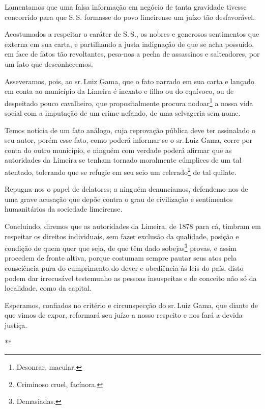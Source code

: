 Lamentamos que uma falsa informação em negócio de tanta gravidade
tivesse concorrido para que S.\,S. formasse do povo limeirense um juízo
tão desfavorável.

Acostumados a respeitar o caráter de S.\,S., os nobres e generosos
sentimentos que externa em sua carta, e partilhando a justa indignação
de que se acha possuído, em face de fatos tão revoltantes,
pesa-nos a pecha de assassinos e salteadores, por um fato que
desconhecemos.

Asseveramos, pois, ao sr.\,Luiz Gama, que o fato narrado em sua carta e
lançado em conta ao município da Limeira é inexato e filho ou do
equívoco, ou de despeitado pouco cavalheiro, que propositalmente procura
nodoar\footnote{Desonrar, macular.} a nossa vida social com a
imputação de um crime nefando, de uma selvageria sem nome.

Temos notícia de um fato análogo, cuja reprovação pública deve ter
assinalado o seu autor, porém esse fato, como poderá informar-se o sr.\,Luiz Gama, corre por conta do outro município, e ninguém com verdade
poderá afirmar que as autoridades da Limeira se tenham tornado
moralmente cúmplices de um tal atentado, tolerando que se refugie em seu
seio um celerado\footnote{Criminoso cruel, facínora.} de tal quilate.

Repugna-nos o papel de delatores; a ninguém denunciamos, defendemo-nos
de uma grave acusação que depõe contra o grau de civilização e
sentimentos humanitários da sociedade limeirense.

Concluindo, diremos que as autoridades da Limeira, de 1878 para cá,
timbram em respeitar os direitos individuais, sem fazer exclusão da
qualidade, posição e condição de quem quer que seja, de que têm dado
sobejas\footnote{Demasiadas.} provas, e assim procedem de fronte
altiva, porque costumam sempre pautar seus atos pela consciência pura do
cumprimento do dever e obediência às leis do país, disto podem dar
irrecusável testemunho as pessoas insuspeitas e de conceito não só da
localidade, como da capital.

Esperamos, confiados no critério e circunspecção do sr.\,Luiz Gama, que
diante de que vimos de expor, reformará seu juízo a nosso respeito e nos
fará a devida justiça.

\medskip

\hfill***
\pagebreak
